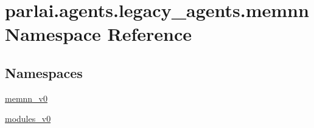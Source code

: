 \hypertarget{namespaceparlai_1_1agents_1_1legacy__agents_1_1memnn}{}\section{parlai.\+agents.\+legacy\+\_\+agents.\+memnn Namespace Reference}
\label{namespaceparlai_1_1agents_1_1legacy__agents_1_1memnn}
\subsection*{Namespaces}
\begin{DoxyCompactItemize}
\item 
 \hyperlink{namespaceparlai_1_1agents_1_1legacy__agents_1_1memnn_1_1memnn__v0}{memnn\+\_\+v0}
\item 
 \hyperlink{namespaceparlai_1_1agents_1_1legacy__agents_1_1memnn_1_1modules__v0}{modules\+\_\+v0}
\end{DoxyCompactItemize}
